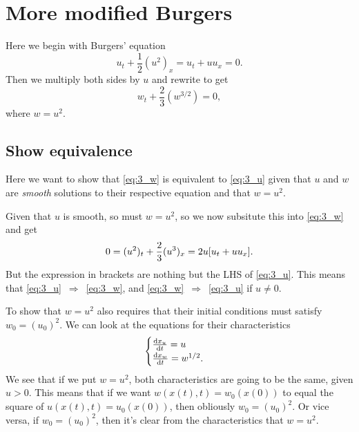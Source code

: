 \documentclass[11pt,letter, swedish, english
]{article}
\renewcommand{\thesubsection}{\arabic{section} (\alph{subsection})}
\begin{document}
\section{More modified Burgers}
\renewcommand{\thesubsection}{\arabic{section} (\alph{subsection})}
Here we begin with Burgers' equation
\begin{equation}\label{eq:3_u}
u_t + \frac{1}{2}(u^2)_x = u_t + uu_x = 0.
\end{equation}
Then we multiply both sides by $u$ and rewrite to get
\begin{equation}\label{eq:3_w}
w_t + \frac{2}{3} (w^{3/2}) = 0,
\end{equation}
where $w=u^2$.

\subsection{Show equivalence}
Here we want to show that \eqref{eq:3_w} is equivalent to
\eqref{eq:3_u} given that $u$ and $w$ are \emph{smooth} solutions to
their respective equation and that $w=u^2$.

Given that $u$ is smooth, so must $w=u^2$, so we now subsitute this
into \eqref{eq:3_w} and get
\begin{equation}
0 = (u^2)_t + \frac{2}{3} (u^{3})_x = 2u \qty[u_t+uu_x].
\end{equation}
But the expression in brackets are nothing but the LHS of
\eqref{eq:3_u}. This means that
\eqref{eq:3_u}~$\Rightarrow$~\eqref{eq:3_w}, and
\eqref{eq:3_w}~$\Rightarrow$~\eqref{eq:3_u} if $u\neq0$.

To show that $w=u^2$ also requires that their initial conditions must
satisfy $w_0=(u_0)^2$. We can look at the equations for their
characteristics
\begin{equation}
\begin{cases}
\dv{x_u}{t} = u \\
\dv{x_w}{t} = w^{1/2}.
\end{cases}
\end{equation}
We see that if we put $w=u^2$, both characteristics are going to be
the same, given $u>0$. This means that if we want $w(x(t),t) =
w_0(x(0))$ to equal the square of $u(x(t),t) = u_0(x(0))$, then
obliously $w_0 = (u_0)^2$. Or vice versa, if $w_0 = (u_0)^2$, then
it's clear from the characteristics that $w=u^2$.\footnotemark{}

\end{document}
